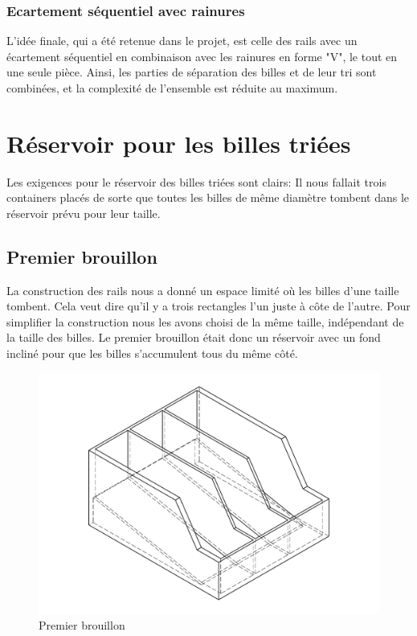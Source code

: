 
\subsubsection{Ecartement séquentiel avec rainures}
L'idée finale, qui a été retenue dans le projet, est celle des rails avec un écartement séquentiel en combinaison avec les rainures en forme "V", le tout en une seule pièce. Ainsi, les parties de séparation des billes et de leur tri sont combinées, et la complexité de l'ensemble est réduite au maximum.

\section{Réservoir pour les billes triées}
Les exigences pour le réservoir des billes triées sont clairs: Il nous fallait trois containers placés de sorte que toutes les billes de même diamètre tombent dans le réservoir prévu pour leur taille.

\subsection{Premier brouillon}
La construction des rails nous a donné un espace limité où les billes d'une taille tombent. Cela veut dire qu'il y a trois rectangles l'un juste à côte de l'autre. Pour simplifier la construction nous les avons choisi de la même taille, indépendant de la taille des billes. Le premier brouillon était donc un réservoir avec un fond incliné pour que les billes s'accumulent tous du même côté.

\begin{figure}
    \centering
    \includegraphics[width=\textwidth]{Graphics/Reservoir_final/PREMIER_BROUILLON.pdf}
    \caption{Premier brouillon}
\end{figure}

